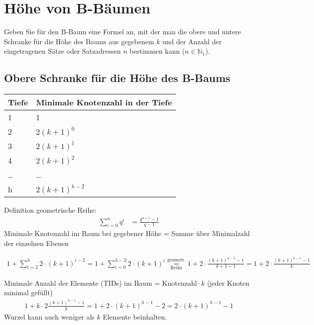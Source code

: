\section{Höhe von B-Bäumen}
Geben Sie für den B-Baum eine Formel an, mit der man die obere und untere Schranke für die Höhe des Baums aus gegebenem $k$ und der Anzahl der eingetragenen Sätze oder Satzadressen $n$ bestimmen kann ($n\in\mathbb{N}_1$).

\begin{solution}

\subsection*{Obere Schranke für die Höhe des B-Baums}
\begin{tabular}{p{2cm} p{8cm}}
	Tiefe			& Minimale Knotenzahl in der Tiefe		\\
	\hline
	1				& 1 														\\
	\hline
	2 				& $2(k+1)^0$ 										\\
	\hline
	3 				& $2(k+1)^1$  									\\
	\hline
	4 				& $2(k+1)^2$ 										\\
	\hline
	\ldots 		& \ldots												\\
	\hline
	h 				& $2(k+1)^{h-2}$ 								\\
	\hline
\end{tabular}

Definition geometrische Reihe:
\begin{align*}
\sum_{i=0}^n q^i &= \frac{q^{n+1}-1}{q-1}
\end{align*}
Minimale Knotenzahl im Baum bei gegebener Höhe =
Summe über Minimalzahl der einzelnen Ebenen

\begin{align*}
1 + \sum_{i = 2}^h 2\cdot (k + 1)^{i-2} = 1 + \sum_{i  = 0}^{h-2} 2 \cdot (k +1)^{i}
\overset{\text{geometr.}}{\underset{\text{Reihe}}{=}} 1 + 2 \cdot \frac{(k +1)^{h-1} - 1}{k + 1 - 1}
= 1 + 2 \cdot \frac{(k + 1)^{h - 1} - 1}{k}
\end{align*}

Minimale Anzahl der Elemente (TIDs) im Baum =
$\mathrm{Knotenzahl} \cdot k$ (jeder Knoten minimal gefüllt)
\begin{align*}
1 + k \cdot 2 \frac{(k + 1)^{h - 1} - 1}{k} = 1 + 2 \cdot (k + 1)^{h - 1} - 2 = 2 \cdot (k + 1)^{h - 1} - 1
\end{align*}
Wurzel kann auch weniger als $k$ Elemente beinhalten.


\end{solution}
